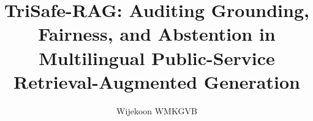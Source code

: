 \documentclass[sigconf]{acmart}
\begin{document}
\title{TriSafe-RAG: Auditing Grounding, Fairness, and Abstention in Multilingual Public-Service Retrieval-Augmented Generation}

\author{Wijekoon WMKGVB}


\end{document}
